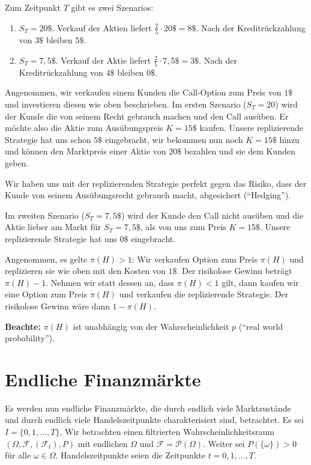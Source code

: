 \documentclass[a4paper,twoside,DIV15,BCOR12mm]{scrbook}
\newcommand{\cF}{\mathcal F}
\begin{document}
\begin{beispiel}
Zum Zeitpunkt $T$ gibt es zwei Szenarios:
\begin{enumerate}
\item $S_T=20\$$. Verkauf der Aktien liefert $\frac 25 \cdot 20\$ = 8\$$. Nach der Kreditrückzahlung von $3\$$ bleiben $5\$$.
\item $S_T=7,5\$$. Verkauf der Aktie liefert $\frac 25 \cdot 7,5\$ = 3\$$. Nach der Kreditrückzahlung von $4\$$ bleiben $0\$$.
\end{enumerate}

Angenommen, wir verkaufen einem Kunden die Call-Option zum Preis von $1\$$ und investieren diesen wie oben beschrieben. Im ersten Szenario ($S_T=20$) wird der Kunde die von seinem Recht gebrauch machen und den Call ausüben. Er möchte also die Aktie zum Ausübungspreis $K=15\$$ kaufen. Unsere replizierende Strategie hat uns schon $5\$$ eingebracht, wir bekommen nun noch $K=15\$$ hinzu und können den Marktpreis einer Aktie von $20\$$ bezahlen und sie dem Kunden geben.

Wir haben uns mit der replizierenden Strategie perfekt gegen das Risiko, dass der Kunde  von seinem Ausübungsrecht gebrauch macht, abgesichert (“Hedging”).

Im zweiten Szenario ($S_T=7,5\$$) wird der Kunde den Call nicht ausüben und die Aktie lieber am Markt für $S_T=7,5\$$, als von uns zum Preis $K=15\$$. Unsere replizierende Strategie hat uns $0\$$ eingebracht.

Angenommen, es gelte $\pi(H)>1$: Wir verkaufen Option zum Preis $\pi(H)$ und replizieren sie wie oben mit den Kosten von $1\$$. Der risikolose Gewinn beträgt $\pi(H) - 1$. Nehmen wir statt dessen an, dass $\pi(H)<1$ gilt, dann kaufen wir eine Option zum Preis $\pi(H)$ und verkaufen die replizierende Strategie. Der risikolose Gewinn wäre dann $1-\pi(H)$.

\textbf{Beachte:} $\pi(H)$ ist unabhängig von der Wahrscheinlichkeit $p$ (“real world probability”).
\end{beispiel}

\section{Endliche Finanzmärkte}

Es werden nun endliche Finanzmärkte, die durch endlich viele Marktzustände und durch endlich viele Handelszeitpunkte charakterisiert sind, betrachtet. Es sei $I=\{0, 1,\ldots,T\}$. Wir betrachten einen filtrierten Wahrscheinlichkeitsraum $(\Omega,\cF,(\cF_t),P)$ mit endlichen $\Omega$ und $\cF=\mathcal P(\Omega)$. Weiter sei $P(\{\omega\})>0$ für alle $\omega\in\Omega$. Handelszeitpunkte seien die Zeitpunkte $t=0, 1,\ldots,T$.
\end{document}
